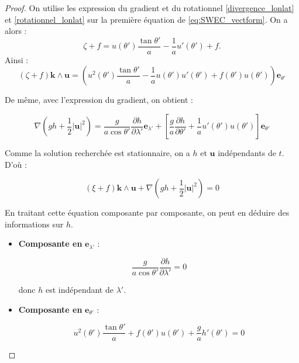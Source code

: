 \begin{proof}
On utilise les expression du gradient et du rotationnel \eqref{divergence_lonlat} et \eqref{rotationnel_lonlat} sur la première équation de \eqref{eq:SWEC_vectform}. On a alors :
\begin{equation}
\zeta + f = u(\theta') \dfrac{\tan \theta'}{a} - \dfrac{1}{a} u'(\theta') + f.
\end{equation}
Ainsi :
\begin{equation}
\left( \zeta + f \right) \mathbf{k} \wedge \mathbf{u} = \left( u^2 (\theta') \dfrac{\tan \theta'}{a} - \dfrac{1}{a} u(\theta') u'(\theta') + f(\theta') u(\theta') \right) \mathbf{e}_{\theta'}
\end{equation}

De même, avec l'expression du gradient, on obtient :

\begin{equation}
\nabla \left( gh + \dfrac{1}{2} |\mathbf{u}|^2 \right) = \dfrac{g}{a \cos \theta'} \dfrac{\partial h}{\partial \lambda'} \mathbf{e}_{\lambda'} + \left[ \dfrac{g}{a} \dfrac{\partial h}{\partial \theta'} + \dfrac{1}{a} u'(\theta') u(\theta') \right] \mathbf{e}_{\theta'}
\end{equation}

Comme la solution recherchée est stationnaire, on a $h$ et $\mathbf{u}$ indépendants de $t$. D'où :

\begin{equation}
\left( \xi + f \right) \mathbf{k} \wedge \mathbf{u} + \nabla \left( gh + \dfrac{1}{2} |\mathbf{u}|^2 \right) = 0
\end{equation}

En traitant cette équation composante par composante, on peut en déduire des informations sur $h$.

\begin{itemize}
\item \textbf{Composante en} $\mathbf{e}_{\lambda'}$ : 

\begin{equation}
\dfrac{g}{a \cos \theta'} \dfrac{\partial h}{\partial \lambda'} = 0
\end{equation}

donc $h$ est indépendant de $\lambda'$.

\item \textbf{Composante en} $\mathbf{e}_{\theta'}$ :

\begin{equation}
u^2 (\theta') \dfrac{\tan \theta'}{a}  + f(\theta') u(\theta') + \dfrac{g}{a} h'(\theta') = 0
\end{equation}


\end{itemize}
\end{proof}
